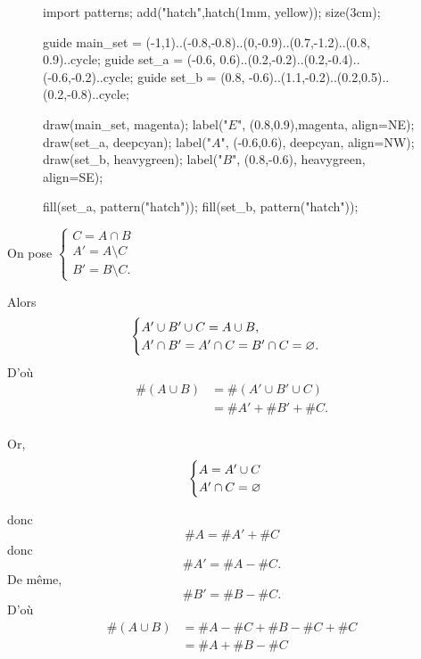 \begin{prv}
	\begin{minipage}{\linewidth}
		\begin{wrapfigure}{r}{3cm}
			\centering
			\vspace{-7mm}
			\begin{asy}
				import patterns;
				add("hatch",hatch(1mm, yellow));
				size(3cm);

				guide main_set = (-1,1)..(-0.8,-0.8)..(0,-0.9)..(0.7,-1.2)..(0.8, 0.9)..cycle;
				guide set_a = (-0.6, 0.6)..(0.2,-0.2)..(0.2,-0.4)..(-0.6,-0.2)..cycle;
				guide set_b = (0.8, -0.6)..(1.1,-0.2)..(0.2,0.5)..(0.2,-0.8)..cycle;

				draw(main_set, magenta); label("$E$", (0.8,0.9),magenta, align=NE);
				draw(set_a, deepcyan); label("$A$", (-0.6,0.6), deepcyan, align=NW);
				draw(set_b, heavygreen); label("$B$", (0.8,-0.6), heavygreen, align=SE);

				fill(set_a, pattern("hatch"));
				fill(set_b, pattern("hatch"));
			\end{asy}
		\end{wrapfigure}
		On pose $\begin{cases}
			C = A\cap B\\
			A' = A \setminus C\\
			B' = B \setminus C.
		\end{cases}$

		Alors \[
			\begin{cases}
				A' \cup B' \cup C = A\cup B,\\
				A' \cap B' = A' \cap C = B'\cap C = \varnothing.
			\end{cases}
		\]
		D'où
		\begin{align*}
			\#(A\cup B) &= \#(A'\cup B'\cup C)\\
			&= \#A' + \#B' + \#C. \\
		\end{align*}

		Or, \[
			\begin{cases}
				A = A' \cup C\\
				A' \cap C = \varnothing
			\end{cases}
		\]
	\end{minipage}

	donc \[
		\#A = \#A' + \#C
	\] donc \[
		\#A' = \#A - \#C.
	\] De même, \[
		\#B' = \#B - \#C.
	\]
	D'où
	\begin{align*}
		\#(A\cup B) &= \#A - \#C + \#B - \#C + \#C \\
		&= \#A + \#B - \#C \\
	\end{align*}
\end{prv}

